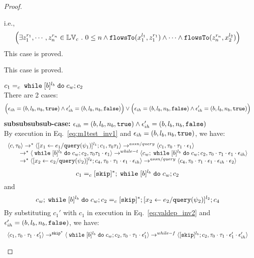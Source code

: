 \begin{proof}
\begin{case}
\begin{subcase}
\begin{subsubcase}
\begin{subproof}
\begin{enumerate}
\begin{enumerate}
\[\]
%
i.e.,
\[
\Big(\exists z_1^{r_1}, \cdots, z_n^{r_n} \in \mathbb{LV}_{{c}} ~.~ 0 \leq n 
 \land \mathtt{flowsTo}(x_1^{l_1}, z_1^{r_1}) \land \cdots \land \mathtt{flowsTo}(z_n^{r_n}, {x}_2^{l_2}) \Big)
\]
%
This case is proved.
\end{enumerate}
%
\end{enumerate}
%
This case is proved.
\end{subproof}
%
\begin{subproof} $c_1 =_c \;\mathtt{while}\; [b]^{l_b} \;\mathtt{do}\; c_w;{c}_2$ 
%
\\
There are 2 cases:
$$
\Big(\mathtt{\epsilon}_{ih} = (b, l_b, n_b, \mathtt{true}) \land \mathtt{\epsilon}_{ih}' = (b, l_b, n_b, \mathtt{false}) \Big)
\lor 
\Big(\mathtt{\epsilon}_{ih} = (b, l_b, n_b, \mathtt{false}) \land \mathtt{\epsilon}_{ih}' = (b, l_b, n_b, \mathtt{true}) \Big)
$$
%
\textbf{subsubsubsub-case:} $\mathtt{\epsilon}_{ih} = (b, l_b, n_b, \mathtt{true}) \land \mathtt{\epsilon}_{ih}' = (b, l_b, n_b, \mathtt{false})$
\\
By execution in Eq.~\ref{eq:m1test_inv1} and $\mathtt{\epsilon}_{ih} = (b, l_b, n_b, \mathtt{true})$, we have:
\[
  \begin{array}{l}   
  \langle {c}, \mathtt{\tau}_0 \rangle \rightarrow^{*} 
  \langle [\mathrel{ {x}_1 \leftarrow e_1 / {\tt query}(\psi_1) }]^{l_1} ; {c}_1, \mathtt{\tau}_0 \mathtt{\tau}_1 \rangle  
  \rightarrow^{assn/query}
  \langle c_1, \mathtt{\tau}_0 \cdot \mathtt{\tau}_1 \cdot \mathtt{\epsilon}_1 \rangle 
  \\
  \qquad \rightarrow^{*} 
  \langle \;\mathtt{while}\; [b]^{l_b} \;\mathtt{do}\; c_w;{c}_2, 
  \mathtt{\tau}_0 \mathtt{\tau}_1 \cdot \mathtt{\epsilon}_1 \rangle 
  \rightarrow^{while-t} 
  \langle c_w;\;\mathtt{while}\; [b]^{l_b} \;\mathtt{do}\; c_w; c_2, \mathtt{\tau}_0 \cdot \mathtt{\tau}_1 \cdot \mathtt{\epsilon}_1 \cdot \mathtt{\epsilon}_{ih} \rangle 
  \\
  \qquad \rightarrow^{*} 
  \langle [\mathrel{ {x}_2 \leftarrow e_2 / {\tt query}(\psi_2) }]^{l_2};{c}_4, 
  \mathtt{\tau}_0 \cdot \mathtt{\tau}_1 \cdot \mathtt{\epsilon}_1 \cdot \mathtt{\epsilon}_{ih} \rangle 
  \rightarrow^{assn/query} 
  \langle {c}_4,  \mathtt{\tau}_0 \cdot \mathtt{\tau}_1 \cdot \mathtt{\epsilon}_1 \cdot \mathtt{\epsilon}_{ih} \cdot \mathtt{\epsilon}_2 \rangle 
  \end{array}
\]
% 
\[
  c_1 =_c [\mathtt{skip}]{}^*; \;\mathtt{while}\; [b]^{l_b} \;\mathtt{do}\; c_w;{c}_2
\]
and
\[
  c_w;\;\mathtt{while}\; [b]^{l_b} \;\mathtt{do}\; c_w; c_2 =_c [\mathtt{skip}]{}^*;[\mathrel{ {x}_2 \leftarrow e_2 / {\tt query}(\psi_2) }]^{l_2};{c}_4
\]
%
By substituting $c_1'$ with $c_1$ in execution in Eq.~\ref{eq:valdep_inv2} and $\mathtt{\epsilon}_{ih}' = (b, l_b, n_b, \mathtt{false})$, we have:
  \[
  \begin{array}{l}   
  \langle c_1, \mathtt{\tau}_0 \cdot \mathtt{\tau}_1 \cdot \mathtt{\epsilon}_1' \rangle 
  \rightarrow^{\mathtt{skip}^*} 
  \langle \;\mathtt{while}\; [b]^{l_b} \;\mathtt{do}\; c_w;{c}_2, \mathtt{\tau}_0 \cdot \mathtt{\tau}_1 \cdot \mathtt{\epsilon}_1' \rangle 
  \rightarrow^{while-f} 
  \langle [\mathtt{skip}]^{l_b};c_2, \mathtt{\tau}_0 \cdot \mathtt{\tau}_1 \cdot \mathtt{\epsilon}_1' \cdot \mathtt{\epsilon}_{ih}' \rangle 

\end{array}\]
\end{subproof}
\end{subsubcase}
\end{subcase}
\end{case}
\end{proof}
